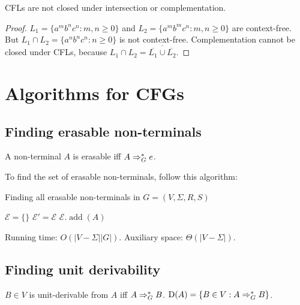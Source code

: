 \begin{theorem}
CFLs are not closed under intersection or complementation.
\end{theorem}
\begin{proof}
$L_1 = \{a^mb^nc^n: m, n \ge 0\}$ and $L_2 = \{a^mb^mc^n: m, n \ge 0\}$ are context-free.
But $L_1 \cap L_2 = \{a^nb^nc^n: n \ge 0\}$ is not context-free.
Complementation cannot be closed under CFLs,
because $L_1 \cap L_2 = \overline{\overline{L_1} \cup \overline{L_2}}$.
\end{proof}

\section{Algorithms for CFGs}

\subsection{Finding erasable non-terminals}

\begin{definition}
A non-terminal $A$ is erasable iff $A \Rightarrow_{G}^* e$.
\end{definition}

To find the set of erasable non-terminals, follow this algorithm:

\begin{algorithm}[H]
\caption{Finding all erasable non-terminals in $G = (V, \Sigma, R, S)$}
\label{algo-erasable-non-terminals}
\begin{algorithmic}
\State $\mathcal{E} = \{\}$
\Do
    \State $\mathcal{E}' = \mathcal{E}$
            \State $\mathcal{E}.\operatorname{add}(A)$
        \EndIf
    \EndFor
{}
\end{algorithmic}
\end{algorithm}

Running time: $O(|V-\Sigma||G|)$.
Auxiliary space: $\Theta(|V-\Sigma|)$.

\subsection{Finding unit derivability}

\begin{definition}
$B \in V$ is unit-derivable from $A$ iff $A \Rightarrow_{G}^* B$.
$\operatorname{D}(A) = \{B \in V: A \Rightarrow_{G}^* B\}$.
\end{definition}

